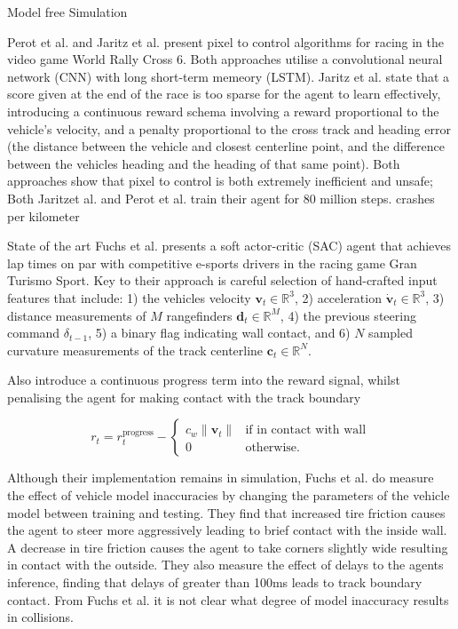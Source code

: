 Model free 
Simulation 

Perot et al. \cite{Perot2017} and Jaritz et al. \cite{Jaritz2018} present pixel to control algorithms for racing in the video game World Rally Cross 6.
Both approaches utilise a convolutional neural network (CNN) with long short-term memeory (LSTM). Jaritz et al. \cite{Jaritz2018} state that a score given at the end of the race is too sparse for the agent to learn effectively, introducing a continuous reward schema involving a reward proportional to the vehicle's velocity, and a penalty proportional to the cross track and heading error (the distance between the vehicle and closest centerline point, and the difference between the vehicles heading and the heading of that same point).
Both approaches show that pixel to control is both extremely inefficient and unsafe; Both Jaritzet al. \cite{Jaritz2018} and Perot et al. \cite{Perot2017} train their agent for 80 million steps.
crashes per kilometer


State of the art
\cite{Fuchs2021}
Fuchs et al. \cite{Fuchs2021} presents a soft actor-critic (SAC) agent that achieves lap times on par with competitive e-sports drivers in the racing game Gran Turismo Sport.
Key to their approach is careful selection of hand-crafted input features that include: 1) the vehicles velocity $\pmb{v}_t \in \mathbb{R}^3$, 2) acceleration $\pmb{\dot{v}}_t \in \mathbb{R}^3$, 3) distance measurements of $M$ rangefinders $\pmb{d}_t \in \mathbb{R}^M$, 4) the previous steering command $\delta_{t-1}$, 5) a binary flag indicating wall contact, and 6) $N$ sampled curvature measurements of the track centerline $\pmb{c}_t \in \mathbb{R}^N$.

Also introduce a continuous progress term into the reward signal, whilst penalising the agent for making contact with the track boundary

\begin{equation}
    r_t = r_{t}^{\text{progress}} - 
    \begin{cases}
    c_w \| \pmb{v}_t \| & \text{if in contact with wall} \\
    0 & \text{otherwise.}
    \end{cases}
\end{equation}

Although their implementation remains in simulation, Fuchs et al. \cite{Fuchs2021} do measure the effect of vehicle model inaccuracies by changing the parameters of the vehicle model between training and testing. They find that increased tire friction causes the agent to steer more aggressively leading to brief contact with the inside wall. A decrease in tire friction causes the agent to take corners slightly wide resulting in contact with the outside.
They also measure the effect of delays to the agents inference, finding that delays of greater than 100ms leads to track boundary contact. 
From Fuchs et al. \cite{Fuchs2021} it is not clear what degree of model inaccuracy results in collisions.


